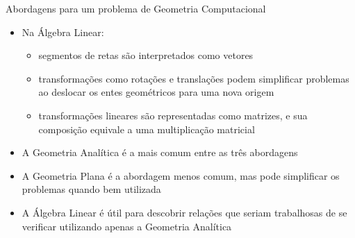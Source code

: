 \begin{frame}[fragile]{Abordagens para um problema de Geometria Computacional}

    \begin{itemize}
 
        \item Na Álgebra Linear: 
    
        \begin{itemize}
            \item segmentos de retas são interpretados como vetores
            \item transformações como rotações e translações podem simplificar problemas ao deslocar os entes geométricos para uma nova origem
            \item transformações lineares são representadas como matrizes, e sua composição equivale a uma multiplicação matricial
        \end{itemize}

        \item A Geometria Analítica é a mais comum entre as três abordagens

        \item A Geometria Plana é a abordagem menos comum, mas pode simplificar os problemas quando bem utilizada
        \item A Álgebra Linear é útil para descobrir relações que seriam trabalhosas de se verificar utilizando apenas a Geometria Analítica
    \end{itemize}

\end{frame}

